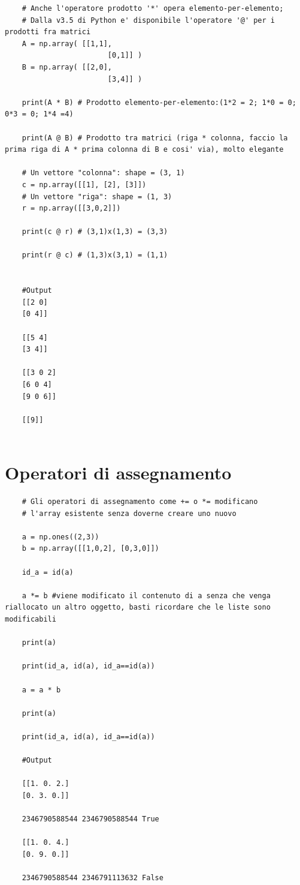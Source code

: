 \begin{lstlisting}
	# Anche l'operatore prodotto '*' opera elemento-per-elemento;
	# Dalla v3.5 di Python e' disponibile l'operatore '@' per i prodotti fra matrici
	A = np.array( [[1,1],
						[0,1]] )
	B = np.array( [[2,0],
						[3,4]] )
	
	print(A * B) # Prodotto elemento-per-elemento:(1*2 = 2; 1*0 = 0; 0*3 = 0; 1*4 =4)
	
	print(A @ B) # Prodotto tra matrici (riga * colonna, faccio la prima riga di A * prima colonna di B e cosi' via), molto elegante
	
	# Un vettore "colonna": shape = (3, 1)
	c = np.array([[1], [2], [3]])
	# Un vettore "riga": shape = (1, 3)
	r = np.array([[3,0,2]])
	
	print(c @ r) # (3,1)x(1,3) = (3,3)
	
	print(r @ c) # (1,3)x(3,1) = (1,1)

	
	#Output
	[[2 0]
	[0 4]]

	[[5 4]
	[3 4]]

	[[3 0 2]
	[6 0 4]
	[9 0 6]]

	[[9]]
	
\end{lstlisting}
\newpage

\section{Operatori di assegnamento}


\begin{lstlisting}
	# Gli operatori di assegnamento come += o *= modificano
	# l'array esistente senza doverne creare uno nuovo
	
	a = np.ones((2,3))
	b = np.array([[1,0,2], [0,3,0]])
	
	id_a = id(a)
	
	a *= b #viene modificato il contenuto di a senza che venga riallocato un altro oggetto, basti ricordare che le liste sono modificabili
	
	print(a)
	
	print(id_a, id(a), id_a==id(a))
	
	a = a * b
	
	print(a)
	
	print(id_a, id(a), id_a==id(a))
	
	#Output
	
	[[1. 0. 2.]
	[0. 3. 0.]]
	
	2346790588544 2346790588544 True
	
	[[1. 0. 4.]
	[0. 9. 0.]]
	
	2346790588544 2346791113632 False
\end{lstlisting}

